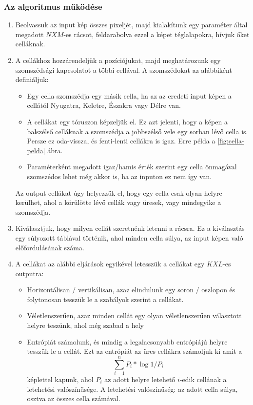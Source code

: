 \subsubsection{Az algoritmus működése}
\begin{enumerate}
    \item Beolvassuk az input kép összes pixeljét, majd kialakítunk egy paraméter által megadott $ NXM$-es rácsot, feldarabolva ezzel a képet téglalapokra, hívjuk őket celláknak.
    \item A cellákhoz hozzárendeljük a pozíciójukat, majd meghatározunk egy szomszédsági kapcsolatot a többi cellával.
    A szomszédokat az alábbiként definiáljuk:
    \begin{itemize}
        \item Egy cella szomszédja egy másik cella, ha az az eredeti input képen a cellától Nyugatra, Keletre, Északra vagy Délre van.
        \item A cellákat egy tóruszon képzeljük el. Ez azt jelenti, hogy a képen a balszélső celláknak a szomszédja a jobbszélső vele egy sorban lévő cella is. Persze ez oda-vissza, és fenti-lenti cellákra is igaz. Erre példa a \ref{fig:cella-pelda} ábra.
        \item Paraméterként megadott igaz/hamis érték szerint egy cella önmagával szomszédos lehet még akkor is, ha az inputon ez nem így van.
    \end{itemize}
    Az output cellákat úgy helyezzük el, hogy egy cella csak olyan helyre kerülhet, ahol a körülötte lévő cellák vagy üresek, vagy mindegyike a szomszédja.
    \item Kiválasztjuk, hogy milyen cellát szeretnénk letenni a rácsra. Ez a kiválasztás egy súlyozott táblával történik, ahol minden cella súlya, az input képen való előfordulásának száma.
    \item A cellákat az alábbi eljárások egyikével letesszük a cellákat egy $KXL$-es outputra:
    \begin{itemize}
    \label{item:modszer}
        \item Horizontálisan / vertikálisan, azaz elindulunk egy soron / oszlopon és folytonosan tesszük le a szabályok szerint a cellákat.
        \item Véletlenszerűen, azaz minden cellát egy olyan véletlenszerűen választott helyre teszünk, ahol még szabad a hely
        \item Entrópiát számolunk, és mindig a legalacsonyabb entrópiájú helyre tesszük le a cellát. Ezt az entrópiát az üres cellákra számoljuk ki amit a $$\sum_{i=1}^{n}P_i * \log{1/P_i}$$ képlettel kapunk, ahol $P_i$ az adott helyre letehető $i$-edik cellának a letehetési valószínűsége. A letehetési valószínűség: az adott cella súlya, osztva az összes cella számával.\\

\end{itemize}
\end{enumerate}
